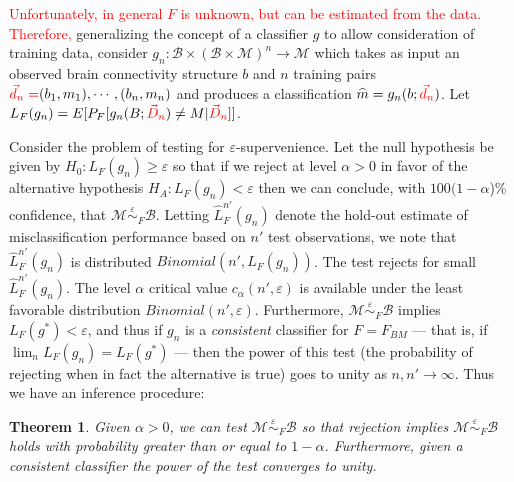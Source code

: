 \documentclass{article}
\newcommand{\mB}{\mathcal{B}}
\newcommand{\mM}{\mathcal{M}}
\newcommand{\hL}{\widehat{L}}
\newcommand{\MeB}{\mM \overset{\varepsilon}{{\sim}}_F \mB}
\providecommand{\tr}[1]{\textcolor{red}{#1}}
\newtheorem{thm}{Theorem}
\begin{document}
\tr{Unfortunately, in general $F$ is unknown, but can be estimated from the data. Therefore,} generalizing the concept of a classifier $g$ to allow consideration of training data, consider $g_n:\mB \times (\mB \times \mM)^n \rightarrow \mM$ which takes as input an observed brain connectivity structure $b$ and $n$ training pairs $\tr{\vec{d}_n=}(b_1,m_1),\cdots,(b_n,m_n)$ and produces a classification $\widehat{m}=g_n(b;\tr{\vec{d}_n})$. Let $L_{F}(g_n) = E[P_{F}[g_n(B;\tr{\vec{D}_n}) \neq M|\tr{\vec{D}_n}]]$.

Consider the problem of testing for $\varepsilon$-supervenience. Let the null hypothesis be given by $H_0: L_{F}(g_n) \geq \varepsilon$ so that if we reject at level $\alpha >0$ in favor of the alternative hypothesis $H_A: L_{F}(g_n) < \varepsilon$ then we can conclude, with $100(1-\alpha$)\% confidence, that $\MeB$. Letting $\hL^{n'}_{F}(g_n)$ denote the hold-out estimate of misclassification performance based on $n'$ test observations, we note that $\hL^{n'}_{F}(g_n)$ is distributed $Binomial(n',L_{F}(g_n))$. The test rejects for small $\hL^{n'}_{F}(g_n)$. The level $\alpha$ critical value $c_{\alpha}(n',\varepsilon)$ is available under the least favorable distribution $Binomial(n',\varepsilon)$. Furthermore, $\MeB$ implies $L_{F}(g^*) < \varepsilon$, and thus if $g_n$ is a {\it consistent} classifier for $F=F_{BM}$ --- that is, if $\lim_n L_{F}(g_n) = L_{F}(g^*)$ --- then the power of this test (the probability of rejecting when in fact the alternative is true) goes to unity as $n,n' \rightarrow \infty$. Thus we have an inference procedure: \begin{thm} \label{thm1} Given $\alpha > 0$, we can test $\MeB$ so that rejection implies $\MeB$ holds with probability greater than or equal to $1-\alpha$. Furthermore, given a consistent classifier the power of the test converges to unity. \end{thm}
\end{document}
